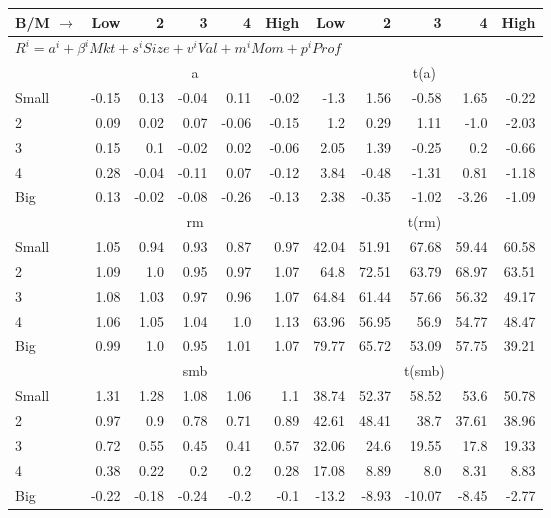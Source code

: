 
\begin{table}[!ht]
\centering
\begin{tabular}{lrrrrrrrrrr}
  \toprule
  B/M $\rightarrow$ & Low & 2 & 3 & 4 & High & Low & 2 & 3 & 4 & High \\ 
  \toprule
  \multicolumn{9}{l}{$R^i=a^i+\beta^iMkt+s^iSize+v^iVal+m^iMom+p^iProf$} \\

  

      & \multicolumn{5}{c}{a} & \multicolumn{5}{c}{t(a)} \\
    \cmidrule(r){2-6} \cmidrule(r){7-11}
      Small  & -0.15  & 0.13  & -0.04  & 0.11  & -0.02   & -1.3  & 1.56  & -0.58  & 1.65  & -0.22  \\
          2  & 0.09  & 0.02  & 0.07  & -0.06  & -0.15   & 1.2  & 0.29  & 1.11  & -1.0  & -2.03  \\
          3  & 0.15  & 0.1  & -0.02  & 0.02  & -0.06   & 2.05  & 1.39  & -0.25  & 0.2  & -0.66  \\
          4  & 0.28  & -0.04  & -0.11  & 0.07  & -0.12   & 3.84  & -0.48  & -1.31  & 0.81  & -1.18  \\
      Big    & 0.13  & -0.02  & -0.08  & -0.26  & -0.13   & 2.38  & -0.35  & -1.02  & -3.26  & -1.09  \\

  

      & \multicolumn{5}{c}{rm} & \multicolumn{5}{c}{t(rm)} \\
    \cmidrule(r){2-6} \cmidrule(r){7-11}
      Small  & 1.05  & 0.94  & 0.93  & 0.87  & 0.97   & 42.04  & 51.91  & 67.68  & 59.44  & 60.58  \\
          2  & 1.09  & 1.0  & 0.95  & 0.97  & 1.07   & 64.8  & 72.51  & 63.79  & 68.97  & 63.51  \\
          3  & 1.08  & 1.03  & 0.97  & 0.96  & 1.07   & 64.84  & 61.44  & 57.66  & 56.32  & 49.17  \\
          4  & 1.06  & 1.05  & 1.04  & 1.0  & 1.13   & 63.96  & 56.95  & 56.9  & 54.77  & 48.47  \\
      Big    & 0.99  & 1.0  & 0.95  & 1.01  & 1.07   & 79.77  & 65.72  & 53.09  & 57.75  & 39.21  \\

  

      & \multicolumn{5}{c}{smb} & \multicolumn{5}{c}{t(smb)} \\
    \cmidrule(r){2-6} \cmidrule(r){7-11}
      Small  & 1.31  & 1.28  & 1.08  & 1.06  & 1.1   & 38.74  & 52.37  & 58.52  & 53.6  & 50.78  \\
          2  & 0.97  & 0.9  & 0.78  & 0.71  & 0.89   & 42.61  & 48.41  & 38.7  & 37.61  & 38.96  \\
          3  & 0.72  & 0.55  & 0.45  & 0.41  & 0.57   & 32.06  & 24.6  & 19.55  & 17.8  & 19.33  \\
          4  & 0.38  & 0.22  & 0.2  & 0.2  & 0.28   & 17.08  & 8.89  & 8.0  & 8.31  & 8.83  \\
      Big    & -0.22  & -0.18  & -0.24  & -0.2  & -0.1   & -13.2  & -8.93  & -10.07  & -8.45  & -2.77  \\


\end{tabular}
\end{table}
